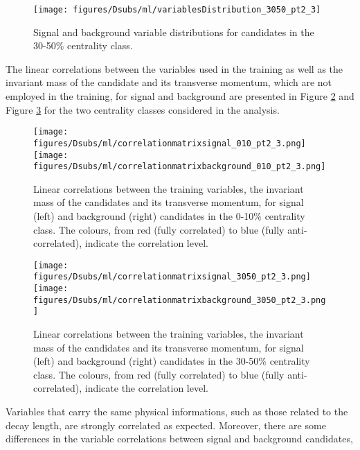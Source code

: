 \begin{figure}[htpb]
  \begin{center}
   \texttt{[image: figures/Dsubs/ml/variablesDistribution\_3050\_pt2\_3]}
   \caption{Signal and background variable distributions for candidates in the 30-50\% centrality class.}
  \label{fig:var_distr_3050}
  \end{center}
\end{figure}
The linear correlations between the variables used in the training as well as the invariant mass of the \Dsubs{} candidate and 
its transverse momentum, which are not employed in the training, for signal and background are presented 
in Figure \ref{fig:corr_010} and Figure \ref{fig:corr_3050} for the two centrality classes considered in the analysis.
\begin{figure}[htbp]
  \begin{center}
   \texttt{[image: figures/Dsubs/ml/correlationmatrixsignal\_010\_pt2\_3.png]}
   \texttt{[image: figures/Dsubs/ml/correlationmatrixbackground\_010\_pt2\_3.png]} 
  \caption{Linear correlations between the training variables, the invariant mass of the \Dsubs{} candidates and its transverse 
  momentum, for signal (left) and background (right) candidates in the 0-10\% centrality class. The colours, 
  from red (fully correlated) to blue (fully anti-correlated), indicate the correlation level.}
  \label{fig:corr_010}
  \end{center}
\end{figure}
\begin{figure}[htbp]
  \begin{center}
   \texttt{[image: figures/Dsubs/ml/correlationmatrixsignal\_3050\_pt2\_3.png]}
   \texttt{[image: figures/Dsubs/ml/correlationmatrixbackground\_3050\_pt2\_3.png]} 
  \caption{Linear correlations between the training variables, the invariant mass of the \Dsubs{} candidates and its transverse 
  momentum, for signal (left) and background (right) candidates in the 30-50\% centrality class. The colours, 
  from red (fully correlated) to blue (fully anti-correlated), indicate the correlation level.}
  \label{fig:corr_3050}
  \end{center}
\end{figure}
Variables that carry the same physical informations, such as those related to the decay length, are strongly correlated 
as expected. Moreover, there are some differences in the variable correlations between signal and background candidates, 

